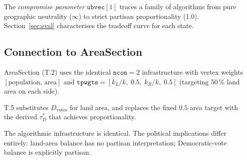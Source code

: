The \emph{compromise parameter} $\mathtt{ubvec}[1]$ traces a family of algorithms
from pure geographic neutrality ($\infty$) to strict partisan proportionality (1.0).
Section~\ref{sec:eval} characterises the tradeoff curve for each state.

\subsection{Connection to AreaSection}

AreaSection (T.2) uses the identical $\mathtt{ncon}=2$ infrastructure with
vertex weights $[\text{population},\, \text{area}]$ and
$\mathtt{tpwgts} = [k_L/k,\; 0.5,\; k_R/k,\; 0.5]$ (targeting 50\,\%
land area on each side).

T.5 substitutes $D_{\text{votes}}$ for land area, and replaces the fixed
$0.5$ area target with the derived $\tau_D^*$ that achieves proportionality.

The algorithmic infrastructure is identical.
The political implications differ entirely:
land-area balance has no partisan interpretation; Democratic-vote balance
is explicitly partisan.
